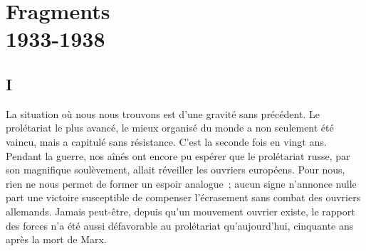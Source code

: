 \documentclass[french,twoside]{book} %
\begin{document}
\section[Fragments, 1933-1938]{Fragments \\
1933-1938}\renewcommand{\leftmark}{Fragments \\
1933-1938}

\noindent \par
\subsection[I]{I}
\noindent La situation où nous nous trouvons est d'une gravité sans précédent. Le prolétariat le plus avancé, le mieux organisé du monde a non seulement été vaincu, mais a capitulé sans résistance. C'est la seconde fois en vingt ans. Pendant la guerre, nos aînés ont encore pu espérer que le prolétariat russe, par son magnifique soulèvement, allait réveiller les ouvriers européens. Pour nous, rien ne nous permet de former un espoir analogue ; aucun signe n'annonce nulle part une victoire susceptible de compenser l'écrasement sans combat des ouvriers allemands. Jamais peut-être, depuis qu'un mouvement ouvrier existe, le rapport des forces n'a été aussi défavorable au prolétariat qu'aujourd'hui, cinquante ans après la mort de Marx.\par
\end{document}

